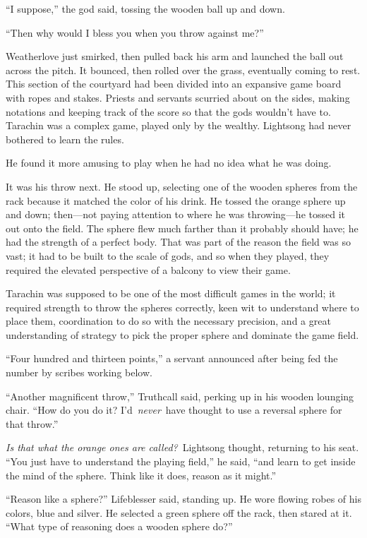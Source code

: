“I suppose,” the god said, tossing the wooden ball up and down.

“Then why would I bless you when you throw against me?”

Weatherlove just smirked, then pulled back his arm and launched the ball out across the pitch. It bounced, then rolled over the grass, eventually coming to rest. This section of the courtyard had been divided into an expansive game board with ropes and stakes. Priests and servants scurried about on the sides, making notations and keeping track of the score so that the gods wouldn’t have to. Tarachin was a complex game, played only by the wealthy. Lightsong had never bothered to learn the rules.

He found it more amusing to play when he had no idea what he was doing.

It was his throw next. He stood up, selecting one of the wooden spheres from the rack because it matched the color of his drink. He tossed the orange sphere up and down; then—not paying attention to where he was throwing—he tossed it out onto the field. The sphere flew much farther than it probably should have; he had the strength of a perfect body. That was part of the reason the field was so vast; it had to be built to the scale of gods, and so when they played, they required the elevated perspective of a balcony to view their game.

Tarachin was supposed to be one of the most difficult games in the world; it required strength to throw the spheres correctly, keen wit to understand where to place them, coordination to do so with the necessary precision, and a great understanding of strategy to pick the proper sphere and dominate the game field.

“Four hundred and thirteen points,” a servant announced after being fed the number by scribes working below.

“Another magnificent throw,” Truthcall said, perking up in his wooden lounging chair. “How do you do it? I’d~\textit{never}~have thought to use a reversal sphere for that throw.”

\textit{Is that what the orange ones are called?}~Lightsong thought, returning to his seat. “You just have to understand the playing field,” he said, “and learn to get inside the mind of the sphere. Think like it does, reason as it might.”

“Reason like a sphere?” Lifeblesser said, standing up. He wore flowing robes of his colors, blue and silver. He selected a green sphere off the rack, then stared at it. “What type of reasoning does a wooden sphere do?”

